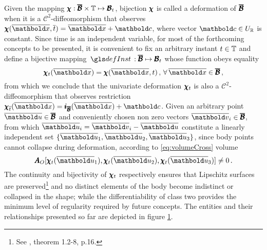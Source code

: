Given the mapping $\pmb{\chi} : \pmb{\overline{\mathcal{B}}}\times\mathbb{T} \mapsto \pmb{\mathcal{B}}_t$, bijection $\pmb{\chi}$ is called a deformation of $\pmb{\overline{\mathcal{B}}}$ when it is a $\mathcal{C}^{2}$-diffeomorphism that observes $\fua{\tnr{\chi}}{\overline{\vto{x}},\overline{t}}=\overline{\vto{x}}+\vto{c}$, where vector $\vto{c}\in U_\real$ is constant. Since time is an independent variable, for most of the forthcoming concepts to be presented, it is convenient to fix an arbitrary instant $t\in\mathbb{T}$ and define a bijective mapping $\map{\gloref{defInst}}{\tnr{\overline{\mathcal{B}}}}{\tnr{\mathcal{B}}_t}$ whose function obeys equality 
\begin{equation}
\fua{\tnr{\chi}_t}{\overline{\vto{x}}}=\fua{\tnr{\chi}}{\overline{\vto{x}},t}\,,\,\forall\, \overline{\vto{x}}\in\tnr{\overline{\mathcal{B}}}\,,
\end{equation}
from which we conclude that the univariate deformation $\pmb{\chi}_t$ is also a $\mathcal{C}^{2}$-diffeomorphism that observes restriction $\tnr{\chi}_{\overline{t}}(\overline{\vto{x}})=\tnr{i}_{\tnr{\overline{\mathcal{B}}}}(\overline{\vto{x}})+\vto{c}$. Given an arbitrary point $\overline{\vto{u}}\in\tnr{\overline{\mathcal{B}}}$ and conveniently chosen non zero vectors $\overline{\vto{v}}_i\in\tnr{\overline{\mathcal{B}}}$, from which $\overline{\vto{u}}_i=\overline{\vto{v}}_i-\overline{\vto{u}}$ constitute a linearly independent set $\{ \overline{\vto{u}}_1,\overline{\vto{u}}_2,\overline{\vto{u}}_3\}$, since body points cannot collapse during deformation, according to \eqref{eq:volumeCross} volume
\begin{equation}
{\tnr{A}_O}[\fua{\tnr{\chi}_t}{\overline{\vto{u}}_1},\fua{\tnr{\chi}_t}{\overline{\vto{u}}_2},\fua{\tnr{\chi}_t}{\overline{\vto{u}}_3}]\neq 0\,.
\end{equation}
The continuity and bijectivity of $\pmb{\chi}_t$ respectively ensures that Lipschitz surfaces are preserved\footnote{See \cite{ciarlet_1988_2_2}, theorem 1.2-8, p.16.} and no distinct elements of the body become indistinct or collapsed in the shape; while the differentiability of class two provides the minimum level of regularity required by future concepts. The entities and their relationships presented so far are depicted in figure \ref{fg:deformacao}. 
\begin{figure}[!ht]
\centering
\begin{center}
\scalebox{.72}{}
\end{center}
\label{fg:deformacao}
\end{figure}
